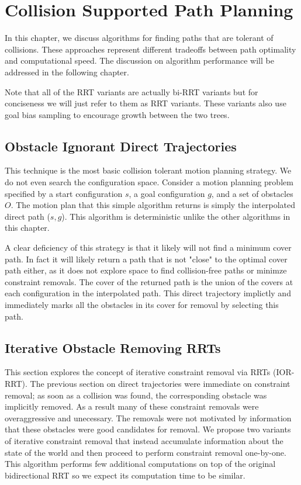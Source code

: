 \chapter{Collision Supported Path Planning} \label{chap:algos}
In this chapter, we discuss algorithms for finding paths that are tolerant of collisions. These approaches represent different tradeoffs between path optimality and computational speed. The discussion on algorithm performance will be addressed in the following chapter.

Note that all of the RRT variants are actually bi-RRT variants but for conciseness we will just refer to them as RRT variants. These variants also use goal bias sampling to encourage growth between the two trees.

\section{Obstacle Ignorant Direct Trajectories}
This technique is the most basic collision tolerant motion planning strategy. We do not even search the configuration space. Consider a motion planning problem specified by a start configuration $s$, a goal configuration $g$, and a set of obstacles $O$. The motion plan that this simple algorithm returns is simply the interpolated direct path ($s, g$). This algorithm is deterministic unlike the other algorithms in this chapter. 

A clear deficiency of this strategy is that it likely will not find a minimum cover path. In fact it will likely return a path that is not "close" to the optimal cover path either, as it does not explore space to find collision-free paths or minimze constraint removals. The cover of the returned path is the union of the covers at each configuration in the interpolated path. This direct trajectory implictly and immediately marks all the obstacles in its cover for removal by selecting this path.

\section{Iterative Obstacle Removing RRTs}
This section explores the concept of iterative constraint removal via RRTs (IOR-RRT). The previous section on direct trajectories were immediate on constraint removal; as soon as a collision was found, the corresponding obstacle was implicitly removed. As a result many of these constraint removals were overaggressive and unecessary. The removals were not motivated by information that these obstacles were good candidates for removal. We propose two variants of iterative constraint removal that instead accumulate information about the state of the world and then proceed to perform constraint removal one-by-one. This algorithm performs few additional computations on top of the original bidirectional RRT so we expect its computation time to be similar.

